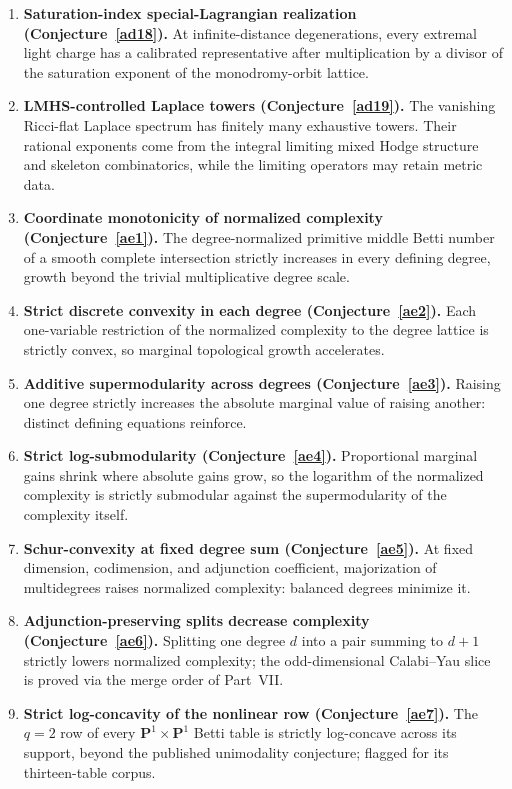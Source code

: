 \documentclass[11pt]{article}
\theoremstyle{definition}
\begin{document}
\begin{enumerate}
\item \textbf{Saturation-index special-Lagrangian realization (Conjecture~\ref{ad18}).}  At infinite-distance degenerations, every extremal light charge has a calibrated representative after multiplication by a divisor of the saturation exponent of the monodromy-orbit lattice.
\item \textbf{LMHS-controlled Laplace towers (Conjecture~\ref{ad19}).}  The vanishing Ricci-flat Laplace spectrum has finitely many exhaustive towers.  Their rational exponents come from the integral limiting mixed Hodge structure and skeleton combinatorics, while the limiting operators may retain metric data.
\item \textbf{Coordinate monotonicity of normalized complexity (Conjecture~\ref{ae1}).}  The degree-normalized primitive middle Betti number of a smooth complete intersection strictly increases in every defining degree, growth beyond the trivial multiplicative degree scale.
\item \textbf{Strict discrete convexity in each degree (Conjecture~\ref{ae2}).}  Each one-variable restriction of the normalized complexity to the degree lattice is strictly convex, so marginal topological growth accelerates.
\item \textbf{Additive supermodularity across degrees (Conjecture~\ref{ae3}).}  Raising one degree strictly increases the absolute marginal value of raising another: distinct defining equations reinforce.
\item \textbf{Strict log-submodularity (Conjecture~\ref{ae4}).}  Proportional marginal gains shrink where absolute gains grow, so the logarithm of the normalized complexity is strictly submodular against the supermodularity of the complexity itself.
\item \textbf{Schur-convexity at fixed degree sum (Conjecture~\ref{ae5}).}  At fixed dimension, codimension, and adjunction coefficient, majorization of multidegrees raises normalized complexity: balanced degrees minimize it.
\item \textbf{Adjunction-preserving splits decrease complexity (Conjecture~\ref{ae6}).}  Splitting one degree $d$ into a pair summing to $d+1$ strictly lowers normalized complexity; the odd-dimensional Calabi--Yau slice is proved via the merge order of Part~VII.
\item \textbf{Strict log-concavity of the nonlinear row (Conjecture~\ref{ae7}).}  The $q=2$ row of every $\mathbf P^1\times\mathbf P^1$ Betti table is strictly log-concave across its support, beyond the published unimodality conjecture; flagged for its thirteen-table corpus.

\end{enumerate}
\end{document}

